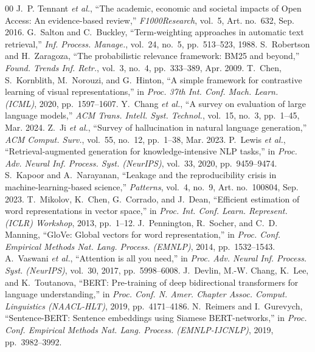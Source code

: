 \documentclass[journal]{IEEEtran}
\begin{document}

\begin{thebibliography}{00}
 J.~P. Tennant \textit{et al.}, ``The academic, economic and societal impacts of Open Access: An evidence-based review,'' \textit{F1000Research}, vol.~5, Art. no.~632, Sep. 2016.
 G.~Salton and C.~Buckley, ``Term-weighting approaches in automatic text retrieval,'' \textit{Inf. Process. Manage.}, vol.~24, no.~5, pp.~513--523, 1988.
 S.~Robertson and H.~Zaragoza, ``The probabilistic relevance framework: BM25 and beyond,'' \textit{Found. Trends Inf. Retr.}, vol.~3, no.~4, pp.~333--389, Apr. 2009.
 T.~Chen, S.~Kornblith, M.~Norouzi, and G.~Hinton, ``A simple framework for contrastive learning of visual representations,'' in \textit{Proc. 37th Int. Conf. Mach. Learn. (ICML)}, 2020, pp.~1597--1607.
 Y.~Chang \textit{et al.}, ``A survey on evaluation of large language models,'' \textit{ACM Trans. Intell. Syst. Technol.}, vol.~15, no.~3, pp.~1--45, Mar. 2024.
 Z.~Ji \textit{et al.}, ``Survey of hallucination in natural language generation,'' \textit{ACM Comput. Surv.}, vol.~55, no.~12, pp.~1--38, Mar. 2023.
 P.~Lewis \textit{et al.}, ``Retrieval-augmented generation for knowledge-intensive NLP tasks,'' in \textit{Proc. Adv. Neural Inf. Process. Syst. (NeurIPS)}, vol.~33, 2020, pp.~9459--9474.
 S.~Kapoor and A.~Narayanan, ``Leakage and the reproducibility crisis in machine-learning-based science,'' \textit{Patterns}, vol.~4, no.~9, Art. no.~100804, Sep. 2023.
 T.~Mikolov, K.~Chen, G.~Corrado, and J.~Dean, ``Efficient estimation of word representations in vector space,'' in \textit{Proc. Int. Conf. Learn. Represent. (ICLR) Workshop}, 2013, pp.~1--12.
 J.~Pennington, R.~Socher, and C.~D. Manning, ``GloVe: Global vectors for word representation,'' in \textit{Proc. Conf. Empirical Methods Nat. Lang. Process. (EMNLP)}, 2014, pp.~1532--1543.
 A.~Vaswani \textit{et al.}, ``Attention is all you need,'' in \textit{Proc. Adv. Neural Inf. Process. Syst. (NeurIPS)}, vol.~30, 2017, pp.~5998--6008.
 J.~Devlin, M.-W. Chang, K.~Lee, and K.~Toutanova, ``BERT: Pre-training of deep bidirectional transformers for language understanding,'' in \textit{Proc. Conf. N. Amer. Chapter Assoc. Comput. Linguistics (NAACL-HLT)}, 2019, pp.~4171--4186.
 N.~Reimers and I.~Gurevych, ``Sentence-BERT: Sentence embeddings using Siamese BERT-networks,'' in \textit{Proc. Conf. Empirical Methods Nat. Lang. Process. (EMNLP-IJCNLP)}, 2019, pp.~3982--3992.

\end{thebibliography}
\end{document}
